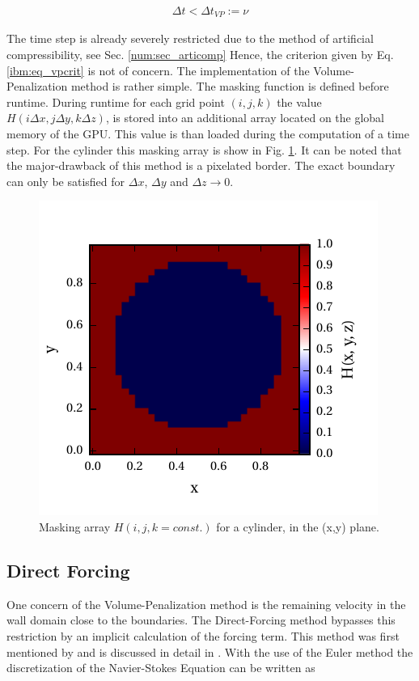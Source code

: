 \begin{align}
    \label{ibm:eq_vpcrit}
    \Delta t < \Delta t_{VP} := \nu
\end{align}

The time step is already severely restricted due to the method of artificial compressibility, see Sec. \ref{num:sec_articomp}
Hence, the criterion given by Eq. \ref{ibm:eq_vpcrit} is not of concern.
The implementation of the Volume-Penalization method is rather simple.
The masking function is defined before runtime.
During runtime for each grid point ${(i, j, k)}$ the value ${H(i\Delta x, j\Delta y, k \Delta z)}$,
is stored into an additional array located on the global memory of the GPU.
This value is than loaded during the computation of a time step.
For the cylinder this masking array is show in Fig. \ref{fig:ibm_maskvolpen}.
It can be noted that the major-drawback of this method is a pixelated border.
The exact boundary can only be satisfied for $\Delta x$, $\Delta y$ and $\Delta z \rightarrow 0$.

\begin{figure}[!t]
    \centering
    \includegraphics{gfx/immersed_boundary/methods/mask_volpen.pdf}
    \caption{Masking array $H(i,j,k=const.)$ for a cylinder, in the (x,y) plane.}
    \label{fig:ibm_maskvolpen}
\end{figure}

\subsection{Direct Forcing}

One concern of the Volume-Penalization method is the remaining velocity in the wall domain close to the boundaries.
The Direct-Forcing method bypasses this restriction by an implicit calculation of the forcing term.
This method was first mentioned by \citep{mohdyusof:1997} and is discussed in detail in \citep{Fadlun2000}.
With the use of the Euler method the discretization of the Navier-Stokes Equation can be written as

